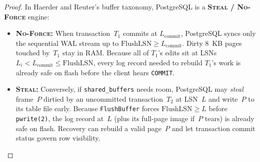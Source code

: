 \begin{proof}
In Haerder and Reuter's buffer taxonomy, PostgreSQL is a \textbf{\textsc{Steal} / \textsc{No-Force}} engine:
\begin{itemize}
  \item \textbf{\textsc{No-Force}:} When transaction~$T_1$ commits at $L_{\text{commit}}$, PostgreSQL syncs only the sequential WAL stream up to $\mathrm{FlushLSN} \ge L_{\text{commit}}$. Dirty 8~KB pages touched by~$T_1$ stay in RAM. Because all of $T_1$'s edits sit at LSNs $L_i < L_{\text{commit}} \le \mathrm{FlushLSN}$, every log record needed to rebuild $T_1$'s work is already safe on flash before the client hears \texttt{COMMIT}.
  \item \textbf{\textsc{Steal}:} Conversely, if \texttt{shared\_buffers} needs room, PostgreSQL may \emph{steal} frame~$P$ dirtied by an uncommitted transaction~$T_2$ at LSN~$L$ and write~$P$ to its table file early. Because \texttt{FlushBuffer} forces $\mathrm{FlushLSN} \ge L$ before \texttt{pwrite(2)}, the log record at~$L$ (plus its full-page image if~$P$ tears) is already safe on flash. Recovery can rebuild a valid page~$P$ and let transaction commit status govern row visibility. \qedhere
\end{itemize}
\end{proof}

